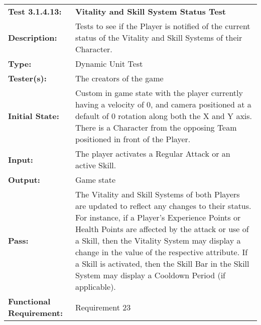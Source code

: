 \documentclass[12pt, titlepage]{article}
\begin{document}
\begin{mdframed}[linewidth=1pt]
\begin{tabularx}{\textwidth}{@{}p{3cm}X@{}}
{\bf Test 3.1.4.13:} & {\bf Vitality and Skill System Status Test}\\[\baselineskip]
{\bf Description:} & Tests to see if the Player is notified of the current status of the Vitality and Skill Systems of their Character. \\[0.5\baselineskip]
{\bf Type:} & Dynamic Unit Test\\[0.5\baselineskip]
{\bf Tester(s):} & The creators of the game\\[0.5\baselineskip]
{\bf Initial State:} & Custom in game state with the player currently having a velocity of 0, and camera positioned at a default of 0 rotation along both the X and Y axis. There is a Character from the opposing Team positioned in front of the Player. \\[0.5\baselineskip]
{\bf Input:} & The player activates a Regular Attack or an active Skill. \\[0.5\baselineskip]
{\bf Output:} & Game state\\[0.5\baselineskip]
{\bf Pass:} & The Vitality and Skill Systems of both Players are updated to reflect any changes to their status. For instance, if a Player's Experience Points or Health Points are affected by the attack or use of a Skill, then the Vitality System may display a change in the value of the respective attribute. If a Skill is activated, then the Skill Bar in the Skill System may display a Cooldown Period (if applicable). \\[0.5\baselineskip]
{\bf Functional Requirement:} & Requirement 23
\end{tabularx}
\end{mdframed}
\end{document}
